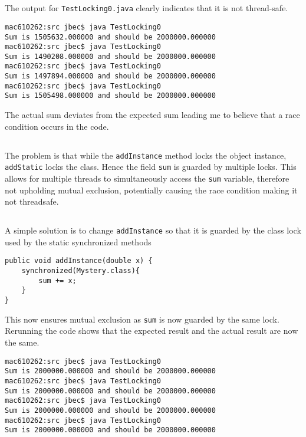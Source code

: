 \documentclass{ituhandin}
\begin{document}
\maketitlepage
\signpage

\chapter{} %

\section{}
The output for \texttt{TestLocking0.java} clearly indicates that it is not thread-safe.
\begin{lstlisting}[language={}, frame={}]
mac610262:src jbec$ java TestLocking0
Sum is 1505632.000000 and should be 2000000.000000
mac610262:src jbec$ java TestLocking0
Sum is 1490208.000000 and should be 2000000.000000
mac610262:src jbec$ java TestLocking0
Sum is 1497894.000000 and should be 2000000.000000
mac610262:src jbec$ java TestLocking0
Sum is 1505498.000000 and should be 2000000.000000
\end{lstlisting}

The actual sum deviates from the expected sum leading me to believe that a race condition occurs in the code.

\section{}
The problem is that while the \texttt{addInstance} method locks the object instance, \texttt{addStatic} locks the class. Hence the field \texttt{sum} is guarded by multiple locks. This allows for multiple threads to simultaneously access the \texttt{sum} variable, therefore not upholding mutual exclusion, potentially causing the race condition making it not threadsafe.

\section{}
A simple solution is to change \texttt{addInstance} so that it is guarded by the class lock used by the static synchronized methods
\begin{lstlisting}[frame={}]
public void addInstance(double x) {
    synchronized(Mystery.class){
        sum += x;
    }
}
\end{lstlisting}
This now ensures mutual exclusion as \texttt{sum} is now guarded by the same lock. Rerunning the code shows that the expected result and the actual result are now the same.

\begin{lstlisting}[language={}, frame={}]
mac610262:src jbec$ java TestLocking0
Sum is 2000000.000000 and should be 2000000.000000
mac610262:src jbec$ java TestLocking0
Sum is 2000000.000000 and should be 2000000.000000
mac610262:src jbec$ java TestLocking0
Sum is 2000000.000000 and should be 2000000.000000
mac610262:src jbec$ java TestLocking0
Sum is 2000000.000000 and should be 2000000.000000
\end{lstlisting}
\end{document}
